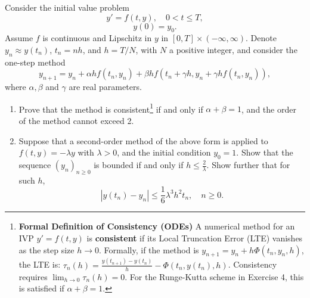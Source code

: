 \begin{exercise}
\label{applied:2023:4}
Consider the initial value problem
\begin{equation}
    y' = f(t, y), \quad 0 < t \leq T, \tag{3}
\end{equation}
\begin{equation}
    y(0) = y_0. \tag{4}
\end{equation}
Assume $f$ is continuous and Lipschitz in $y$ in $[0, T] \times (-\infty, \infty)$. Denote $y_n \approx y(t_n)$, $t_n = nh$, and $h = T/N$, with $N$ a positive integer, and consider the one-step method
\[
    y_{n+1} = y_n + \alpha h f(t_n, y_n) + \beta h f(t_n + \gamma h, y_n + \gamma h f(t_n, y_n)),
\]
where $\alpha, \beta$ and $\gamma$ are real parameters.

\begin{enumerate}[label=(\alph*)]
    \item Prove that the method is consistent\footnote{\textbf{Formal Definition of Consistency (ODEs)} A numerical method for an IVP $y' = f(t, y)$ is \textbf{consistent} if its Local Truncation Error (LTE) vanishes as the step size $h \to 0$. Formally, if the method is $y_{n+1} = y_n + h \Phi(t_n, y_n, h)$, the LTE is: $\tau_n(h) = \frac{y(t_{n+1}) - y(t_n)}{h} - \Phi(t_n, y(t_n), h)$. Consistency requires $\lim_{h \to 0} \tau_n(h) = 0$. For the Runge-Kutta scheme in Exercise 4, this is satisfied if $\alpha + \beta = 1$.} if and only if $\alpha + \beta = 1$, and the order of the method cannot exceed 2.
    \item Suppose that a second-order method of the above form is applied to $f(t, y) = -\lambda y$ with $\lambda > 0$, and the initial condition $y_0 = 1$. Show that the sequence $(y_n)_{n \geq 0}$ is bounded if and only if $h \leq \frac{2}{\lambda}$. Show further that for such $h$,
    \[
        |y(t_n) - y_n| \leq \frac{1}{6} \lambda^3 h^2 t_n, \quad n \geq 0.
    \]
\end{enumerate}
\end{exercise}

